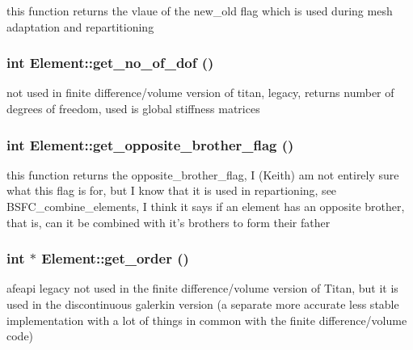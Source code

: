 this function returns the vlaue of the new\_\-old flag which is used during mesh adaptation and repartitioning 

\hypertarget{classElement_a12}{
\subsubsection[get\_\-no\_\-of\_\-dof]{\setlength{\rightskip}{0pt plus 5cm}int Element::get\_\-no\_\-of\_\-dof ()}}
\label{classElement_a12}


not used in finite difference/volume version of titan, legacy, returns number of degrees of freedom, used is global stiffness matrices 

\hypertarget{classElement_a61}{
\subsubsection[get\_\-opposite\_\-brother\_\-flag]{\setlength{\rightskip}{0pt plus 5cm}int Element::get\_\-opposite\_\-brother\_\-flag ()}}
\label{classElement_a61}


this function returns the opposite\_\-brother\_\-flag, I (Keith) am not entirely sure what this flag is for, but I know that it is used in repartioning, see BSFC\_\-combine\_\-elements, I think it says if an element has an opposite brother, that is, can it be combined with it's brothers to form their father 

\hypertarget{classElement_a21}{
\subsubsection[get\_\-order]{\setlength{\rightskip}{0pt plus 5cm}int $\ast$ Element::get\_\-order ()}}
\label{classElement_a21}


afeapi legacy not used in the finite difference/volume version of Titan, but it is used in the discontinuous galerkin version (a separate more accurate less stable implementation with a lot of things in common with the finite difference/volume code) 

